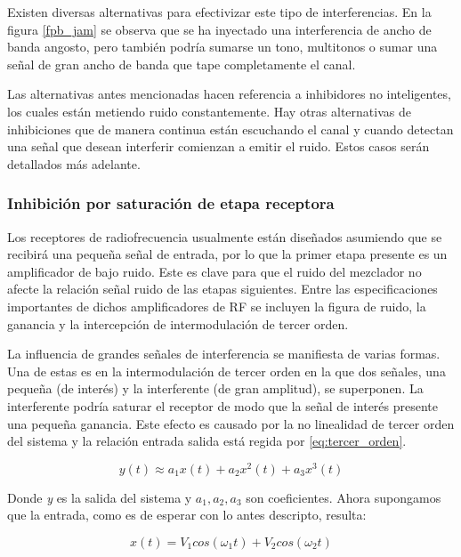 \documentclass[12pt]{report}
\begin{document}
Existen diversas alternativas para efectivizar este tipo de interferencias. En la figura \ref{fpb_jam} se observa que se ha inyectado una
interferencia de ancho de banda angosto, pero también podría sumarse un tono, multitonos o sumar una señal de gran ancho de banda que 
tape completamente el canal. \par
Las alternativas antes mencionadas hacen referencia a inhibidores no inteligentes, los cuales están metiendo ruido constantemente. Hay otras 
alternativas de inhibiciones que de manera continua están escuchando el canal y cuando detectan una señal que 
desean interferir comienzan a emitir el ruido. Estos casos serán detallados más adelante.

\subsubsection{Inhibición por saturación de etapa receptora}

Los receptores de radiofrecuencia usualmente están diseñados asumiendo que se recibirá una pequeña señal de entrada, por lo que la primer
etapa presente es un amplificador de bajo ruido.  Este es clave para que el ruido del mezclador no afecte la relación señal ruido de las 
etapas siguientes. Entre las especificaciones importantes de dichos amplificadores de RF se incluyen la figura de ruido, la ganancia y la 
intercepción de intermodulación de tercer orden.\par \todo[inline, inlinewidth=4cm, noinlinepar]{[6]-[7]}
La influencia de grandes señales de interferencia se manifiesta de varias formas. Una de estas es en la intermodulación de tercer orden en 
la que dos señales, una pequeña (de interés) y la interferente (de gran amplitud), se superponen. La interferente podría saturar el receptor
de modo que la señal de interés presente una pequeña ganancia. Este efecto es causado por la no linealidad de tercer orden del sistema y la relación
entrada salida está regida por \ref{eq:tercer_orden}.

\begin{equation}\label{eq:tercer_orden}
    y(t) \approx  a_1 x(t) + a_2 x^{2}(t) + a_3 x^{3}(t) 
\end{equation}

Donde \emph{y} es la salida del sistema y \(a_1, a_2, a_3 \) son coeficientes. Ahora supongamos que la entrada, como es de esperar con lo antes
descripto, resulta:

\begin{equation}\label{eq:entrada}
    x(t)=V_1 cos(\omega_1 t)+ V_2 cos(\omega_2 t)
\end{equation}
\end{document}
